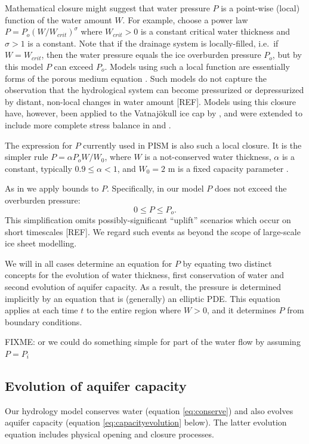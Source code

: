\documentclass[11pt]{amsart}
\begin{document}
Mathematical closure might suggest that water pressure $P$ is a point-wise (local) function of the water amount $W$.  For example, \citet[equation (30)]{FlowersClarke2002_theory} choose a power law $P = P_o (W/W_{crit})^\sigma$ where $W_{crit}>0$ is a constant critical water thickness and $\sigma>1$ is a constant.  Note that if the drainage system is locally-filled, i.e.~if $W=W_{crit}$, then the water pressure equals the ice overburden pressure $P_o$, but by this model $P$ can exceed $P_o$.  Models using such a local function are essentially forms of the porous medium equation \citep{VazquezPME}.  Such models do not capture the observation that the hydrological system can become pressurized or depressurized by distant, non-local changes in water amount [REF].   Models using this closure have, however, been applied to the Vatnaj\"okull ice cap by \citet{Flowersetal2005}, and were extended to include more complete stress balance in \citet{PimentelFlowersSchoof2010} and \citet{PimentelFlowers2011}.

The expression for $P$ currently used in PISM is also such a local closure.  It is the simpler rule $P = \alpha P_o W/W_0$, where $W$ is a not-conserved water thickness, $\alpha$ is a constant, typically $0.9\le \alpha < 1$, and $W_0=2$ m is a fixed capacity parameter \citep[equation (20)]{BBssasliding}.

As in \cite{Schoofetal2012,Hewittetal2012} we apply bounds to $P$.  Specifically, in our model $P$ does not exceed the overburden pressure:
\begin{equation} \label{eq:pressurebounds}
0 \le P \le P_o.
\end{equation}
This simplification omits possibly-significant ``uplift'' scenarios which occur on short timescales [REF].  We regard such events as beyond the scope of large-scale ice sheet modelling.

We will in all cases determine an equation for $P$ by equating two distinct concepts for the evolution of water thickness, first conservation of water and second evolution of aquifer capacity.  As a result, the pressure is determined implicitly by an equation that is (generally) an elliptic PDE.  This equation applies at each time $t$ to the entire region where $W>0$, and it determines $P$ from boundary conditions.

FIXME:  or we could do something simple for part of the water flow by assuming $P=P_i$ \citep{LeBrocqetal2009}

\subsection*{Evolution of aquifer capacity}  Our hydrology model conserves water (equation \eqref{eq:conserve}) and also evolves aquifer capacity (equation \eqref{eq:capacityevolution} below).  The latter evolution equation includes physical opening and closure processes.
\end{document}
